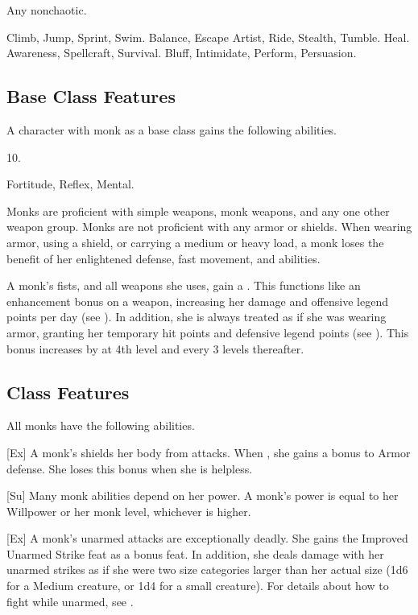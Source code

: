  Any nonchaotic.

 Climb, Jump, Sprint, Swim.
 Balance, Escape Artist, Ride, Stealth, Tumble.
 Heal.
 Awareness, Spellcraft, Survival.
 Bluff, Intimidate, Perform, Persuasion.

\subsection{Base Class Features}
A character with monk as a base class gains the following abilities.

 10.

  Fortitude,  Reflex,  Mental.

Monks are proficient with simple weapons, monk weapons, and any one other weapon group.
Monks are not proficient with any armor or shields.
When wearing armor, using a shield, or carrying a medium or heavy load, a monk loses the benefit of her enlightened defense, fast movement, and \ki abilities.

 A monk's fists, and all weapons she uses, gain a  .
This functions like an enhancement bonus on a weapon, increasing her damage and offensive legend points per day (see ).
In addition, she is always treated as if she was wearing  armor, granting her temporary hit points and defensive legend points (see ).
This bonus increases by  at 4th level and every 3 levels thereafter.

\subsection{Class Features}
All monks have the following abilities.

[Ex]
A monk's \ki shields her body from attacks.
When \monkunencumbered, she gains a  bonus to Armor defense.
She loses this bonus when she is helpless.

[Su]
Many monk abilities depend on her \ki power.
A monk's \ki power is equal to her Willpower or her monk level, whichever is higher.

[Ex]
A monk's unarmed attacks are exceptionally deadly.
She gains the Improved Unarmed Strike feat as a bonus feat.
In addition, she deals damage with her unarmed strikes as if she were two size categories larger than her actual size (1d6 for a Medium creature, or 1d4 for a small creature).
For details about how to fight while unarmed, see .

